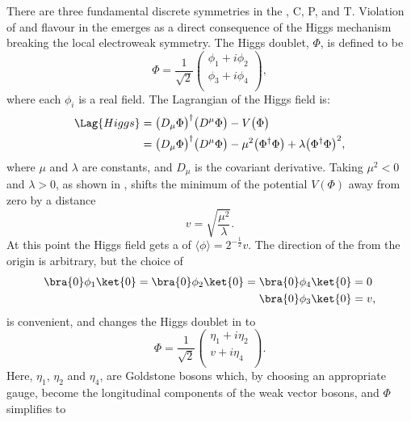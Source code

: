 There are three fundamental discrete symmetries in the \sm, \gls{C}, \gls{P}, and \gls{T}.
Violation of \CP and flavour in the \sm emerges as a direct consequence of the Higgs mechanism
breaking the local electroweak symmetry.
The Higgs doublet, $\Phi$, is defined to be
\begin{equation}
  \Phi = \frac{1}{\sqrt{2}}
  \begin{pmatrix}
    \phi_1 + i\phi_2 \\
    \phi_3 + i\phi_4 \\
  \end{pmatrix},
  \label{eq:th:phi}
\end{equation}
where each $\phi_i$ is a real field.
The Lagrangian of the Higgs field is:
\begin{align}
  \Lag{Higgs}
  &= \big(D_\mu\Phi\big)^\dagger\big(D^\mu\Phi\big) - V\big(\Phi\big) \nonumber\\
  &= \big(D_\mu\Phi\big)^\dagger\big(D^\mu\Phi\big) - \mu^2\big(\Phi^\dagger\Phi\big) +
  \lambda\big(\Phi^\dagger\Phi\big)^{2},
  \label{eq:th:laghiggs1}
\end{align}
where $\mu$ and $\lambda$ are constants, and $D_\mu$ is the covariant derivative.
Taking $\mu^2<0$ and $\lambda>0$,
as shown in ,
shifts the minimum of the potential $V(\Phi)$ away from zero by a
distance
\begin{equation}
  v = \sqrt{\frac{\mu^2}{\lambda}}.
\end{equation}
At this point the Higgs field gets a \VEV
of $\langle\phi\rangle = 2^{-\tfrac{1}{2}}v$.
The direction of the \VEV from the origin is arbitrary, but the choice of
\begin{align}
  \bra{0}\phi_1\ket{0} =
  \bra{0}\phi_2\ket{0} =
  \bra{0}\phi_4\ket{0} &= 0 \nonumber\\
  \bra{0}\phi_3\ket{0} &= v,
\end{align}
is convenient, and changes the Higgs doublet in  to
\begin{equation}
  \Phi = \frac{1}{\sqrt{2}}
  \begin{pmatrix}
    \eta_1 + i\eta_2 \\
    v + i\eta_4 \\
  \end{pmatrix}.
  \label{eq:th:eta}
\end{equation}
Here, $\eta_1$, $\eta_2$ and $\eta_4$, are Goldstone bosons which, by choosing an appropriate
gauge, become the longitudinal components of the weak vector bosons, and $\Phi$ simplifies to
